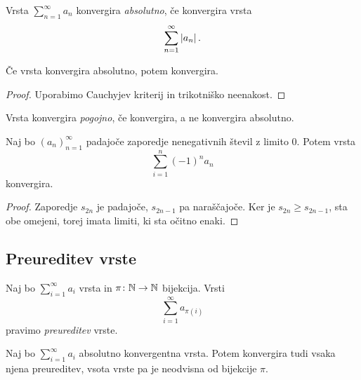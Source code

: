 \documentclass[12pt, a4paper]{article}
\begin{document}
\begin{definicija}
Vrsta $\displaystyle\sum_{n=1}^\infty a_n$ konvergira \emph{absolutno}, če konvergira vrsta
\[
\sum_{n=1}^\infty \left\lvert a_n\right\rvert.
\]
\end{definicija}

\begin{trditev}
Če vrsta konvergira absolutno, potem konvergira.
\end{trditev}

\begin{proof}
Uporabimo Cauchyjev kriterij in trikotniško neenakost.
\end{proof}

\begin{definicija}
Vrsta konvergira \emph{pogojno}, če konvergira, a ne konvergira absolutno.
\end{definicija}

\begin{izrek}
Naj bo $(a_n)_{n=1}^\infty$ padajoče zaporedje nenegativnih števil z limito $0$. Potem vrsta
\[
\sum_{i=1}^n (-1)^n a_n
\]
konvergira.
\end{izrek}

\begin{proof}
Zaporedje $s_{2n}$ je padajoče, $s_{2n-1}$ pa naraščajoče. Ker je $s_{2n}\geq s_{2n-1}$, sta obe omejeni, torej imata limiti, ki sta očitno enaki.
\end{proof}

\newpage

\subsection{Preureditev vrste}

\begin{okvir}
\begin{definicija}
Naj bo $\displaystyle\sum_{i=1}^\infty a_i$ vrsta in $\pi\colon\mathbb{N}\to\mathbb{N}$ bijekcija. Vrsti
\[
\sum_{i=1}^\infty a_{\pi(i)}
\]
pravimo \emph{preureditev} vrste. 
\end{definicija}
\end{okvir}

\begin{izrek}
Naj bo $\displaystyle\sum_{i=1}^\infty a_i$ absolutno konvergentna vrsta. Potem konvergira tudi vsaka njena preureditev, vsota vrste pa je neodvisna od bijekcije $\pi$.
\end{izrek}
\end{document}
